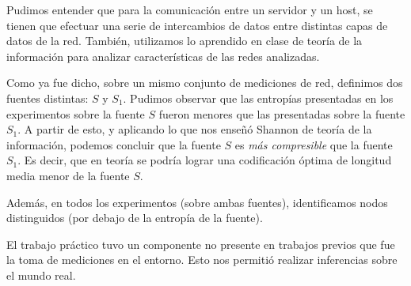 \documentclass[final,inline,a4paper,narroweqnarray]{ieee}
\begin{document}
Pudimos entender que para la comunicación entre un servidor y un host, se
tienen que efectuar una serie de intercambios de datos entre distintas capas
de datos de la red. También, utilizamos lo aprendido en clase de teoría de la
información para analizar características de las redes analizadas.

Como ya fue dicho, sobre un mismo conjunto de mediciones de red, definimos dos
fuentes distintas: $S$ y $S_1$. Pudimos observar que las entropías presentadas
en los experimentos sobre la fuente $S$ fueron menores que las presentadas
sobre la fuente $S_1$. A partir de esto, y aplicando lo que nos enseñó Shannon
de teoría de la información, podemos concluir que la fuente $S$ es \emph{más
compresible} que la fuente $S_1$. Es decir, que en teoría se podría lograr una
codificación óptima de longitud media menor de la fuente $S$.

Además, en todos los experimentos (sobre ambas fuentes),
identificamos nodos distinguidos (por debajo de la entropía de
la fuente).

El trabajo práctico tuvo un componente no presente en trabajos previos que fue
la toma de mediciones en el entorno. Esto nos permitió realizar inferencias
sobre el mundo real.
\end{document}
